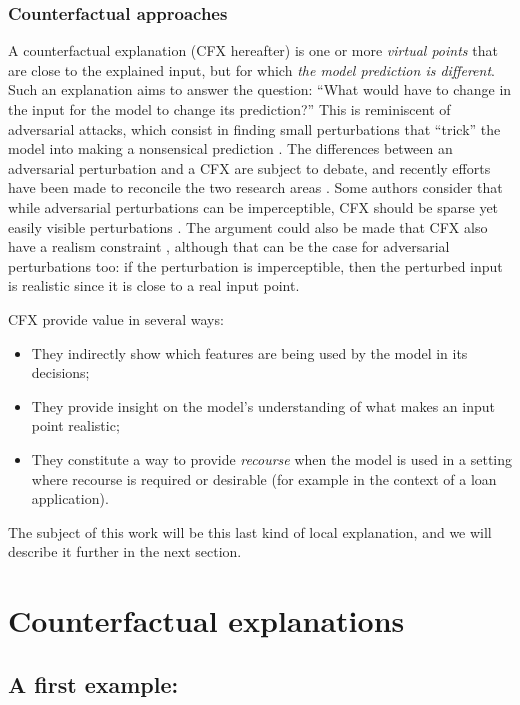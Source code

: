 \documentclass[../main.tex]{subfiles}
\begin{document}
\subsubsection{Counterfactual approaches}\label{par:cfx}

A counterfactual explanation (CFX hereafter) is one or more \emph{virtual points} that are close to the explained input, but for which \emph{the model prediction is different}.
Such an explanation aims to answer the question: ``What would have to change in the input for the model to change its prediction?''
This is reminiscent of adversarial attacks, which consist in finding small perturbations that ``trick'' the model into making a nonsensical prediction \cite{szegedyIntriguing2014,moosavi-dezfooliUniversal2017}.
The differences between an adversarial perturbation and a CFX are subject to debate, and recently efforts have been made to reconcile the two research areas \cite{freieslebenIntriguing2022}.
Some authors consider that while adversarial perturbations can be imperceptible, CFX should be sparse yet easily visible perturbations \cite{laugelLocal2020}.
The argument could also be made that CFX also have a realism constraint \cite{vermaCounterfactual2020}, although that can be the case for adversarial perturbations too: if the perturbation is imperceptible, then the perturbed input is realistic since it is close to a real input point.

CFX provide value in several ways:
\begin{itemize}
    \item They indirectly show which features are being used by the model in its decisions;
    \item They provide insight on the model's understanding of what makes an input point realistic;
    \item They constitute a way to provide \emph{recourse} when the model is used in a setting where recourse is required or desirable (for example in the context of a loan application).
\end{itemize}

The subject of this work will be this last kind of local explanation, and we will describe it further in the next section.

\section{Counterfactual explanations}

\subsection{A first example: \citeauthor{wachterCounterfactual2017}}
\label{intro/wachter}
\end{document}
